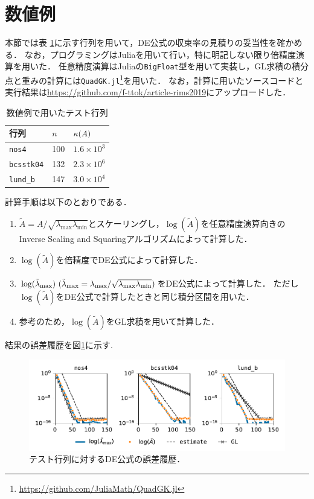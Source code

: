 \documentclass[12pt,a4paper,uplatex,dvipdfmx]{jsarticle}
\newcommand{\lmdmax}{\lambda_{\mathrm{max}}}
\newcommand{\lmdmin}{\lambda_{\mathrm{min}}}
\begin{document}
  \section{数値例}
  本節では表 \ref{tab:matrices}に示す行列を用いて，DE公式の収束率の見積りの妥当性を確かめる．
  なお，プログラミングはJuliaを用いて行い，特に明記しない限り倍精度演算を用いた．
  任意精度演算はJuliaの\texttt{BigFloat}型を用いて実装し，GL求積の積分点と重みの計算には\texttt{QuadGK.jl}\footnote{\url{https://github.com/JuliaMath/QuadGK.jl}}を用いた．
  なお，計算に用いたソースコードと実行結果は\url{https://github.com/f-ttok/article-rims2019}にアップロードした．
  \begin{table}[tbp]
    \centering
    \caption{数値例で用いたテスト行列}
    \label{tab:matrices}
    \begin{tabular}{lll}\hline
      行列 & $n$ & $\kappa(A)$\\\hline
      \texttt{nos4} \cite{davis_university_2011} & 100 & $1.6\times 10^3$ \\
      \texttt{bcsstk04} \cite{davis_university_2011} & 132 & $2.3\times 10^6$ \\
      \texttt{lund\_b} \cite{davis_university_2011} & 147 & $3.0\times 10^4$ \\
      \hline
    \end{tabular}
  \end{table}
  計算手順は以下のとおりである．
  \begin{enumerate}
    \item $\tilde{A} = A/\sqrt{\lmdmax\lmdmin}$とスケーリングし，$\log(\tilde{A})$を任意精度演算向きのInverse Scaling and Squaringアルゴリズム\cite[Alg.\ 5.1]{fasi_computing_2018}によって計算した．
    \item $\log(\tilde{A})$を倍精度でDE公式によって計算した．
    \item $\log(\tilde{\lmd}_{\mathrm{max}})~(\tilde{\lmd}_{\mathrm{max}} = \lmdmax/\sqrt{\lmdmax\lmdmin})$をDE公式によって計算した．
    ただし$\log(\tilde{A})$をDE公式で計算したときと同じ積分区間を用いた．
    \item 参考のため，$\log(\tilde{A})$をGL求積を用いて計算した．
  \end{enumerate}
  結果の誤差履歴を図\ref{fig:test}に示す.

  \begin{figure}[tbp]
    \centering
    \includegraphics[width=\linewidth]{src/test.pdf}
    \caption{テスト行列に対するDE公式の誤差履歴．}
    \label{fig:test}
  \end{figure}
\end{document}
